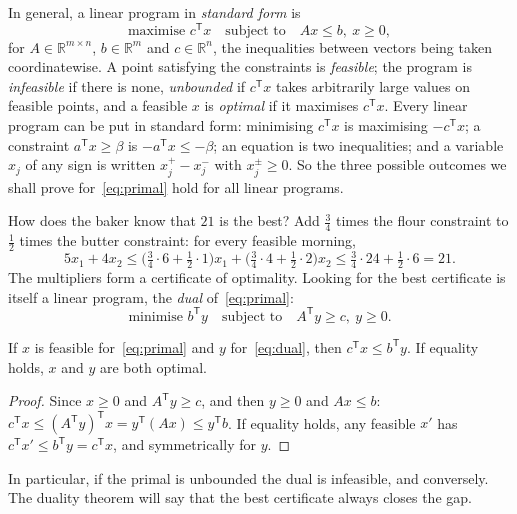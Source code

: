 In general, a linear program in \emph{standard form} is
\begin{equation}\label{eq:primal}
\text{maximise } c^{\mathsf T}x\quad\text{subject to}\quad Ax\le b,\ x\ge0,
\end{equation}
for $A\in\mathbb R^{m\times n}$, $b\in\mathbb R^m$ and $c\in\mathbb R^n$, the inequalities between vectors being taken coordinatewise. A point satisfying the constraints is
\emph{feasible}; the program is \emph{infeasible} if there is none, \emph{unbounded} if $c^{\mathsf T}x$ takes arbitrarily large values on feasible points, and a feasible $x$ is
\emph{optimal} if it maximises $c^{\mathsf T}x$. Every linear program can be put in standard form: minimising $c^{\mathsf T}x$ is maximising $-c^{\mathsf T}x$; a constraint $a^{\mathsf T}x\ge\beta$ is
$-a^{\mathsf T}x\le-\beta$; an equation is two inequalities; and a variable $x_j$ of any sign is written $x_j^+-x_j^-$ with $x_j^\pm\ge0$. So the three possible outcomes we
shall prove for~\eqref{eq:primal} hold for all linear programs.

How does the baker know that $21$ is the best? Add $\tfrac34$ times the flour constraint to $\tfrac12$ times the butter constraint: for every feasible morning,
\[
5x_1+4x_2\le\bigl(\tfrac34\cdot6+\tfrac12\cdot1\bigr)x_1+\bigl(\tfrac34\cdot4+\tfrac12\cdot2\bigr)x_2\le\tfrac34\cdot24+\tfrac12\cdot6=21.
\]
The multipliers form a certificate of optimality. Looking for the best certificate is itself a linear program, the \emph{dual} of~\eqref{eq:primal}:
\begin{equation}\label{eq:dual}
\text{minimise } b^{\mathsf T}y\quad\text{subject to}\quad A^{\mathsf T}y\ge c,\ y\ge0.
\end{equation}

\begin{proposition}\label{prop:weakduality}
If $x$ is feasible for~\eqref{eq:primal} and $y$ for~\eqref{eq:dual}, then $c^{\mathsf T}x\le b^{\mathsf T}y$. If equality holds, $x$ and $y$ are both optimal.
\end{proposition}
\begin{proof}
Since $x\ge0$ and $A^{\mathsf T}y\ge c$, and then $y\ge0$ and $Ax\le b$: $c^{\mathsf T}x\le(A^{\mathsf T}y)^{\mathsf T}x=y^{\mathsf T}(Ax)\le y^{\mathsf T}b$. If equality holds, any feasible $x'$ has $c^{\mathsf T}x'\le b^{\mathsf T}y=c^{\mathsf T}x$, and symmetrically for $y$.
\end{proof}

In particular, if the primal is unbounded the dual is infeasible, and conversely. The duality theorem will say that the best certificate always closes the gap.

